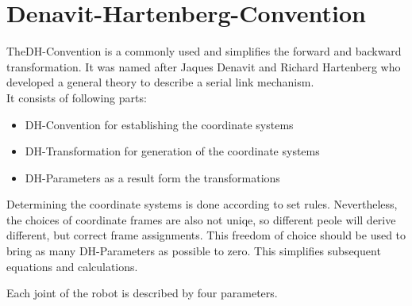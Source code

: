 \chapter{Denavit-Hartenberg-Convention}

The\ac{DH}-Convention is a commonly used and simplifies the forward and backward transformation. It was named after Jaques Denavit and Richard Hartenberg who developed a general theory to describe a serial link mechanism. \cite{DenavitHartenbergLesson}\\
It consists of following parts:

\begin{itemize}[leftmargin=3cm]
	\item \ac{DH}-Convention for establishing the coordinate systems
	\item \ac{DH}-Transformation for generation of the coordinate systems
	\item \ac{DH}-Parameters as a result form the transformations
\end{itemize}

Determining the coordinate systems is done according to set rules. Nevertheless, the choices of coordinate frames are also not uniqe, so different peole will derive different, but correct frame assignments. This freedom of choice should be used to bring as many \ac{DH}-Parameters as possible to zero. This simplifies subsequent equations and calculations. \cite{DenavitHartenbergKonventionen}

Each joint of the robot is described by four parameters.